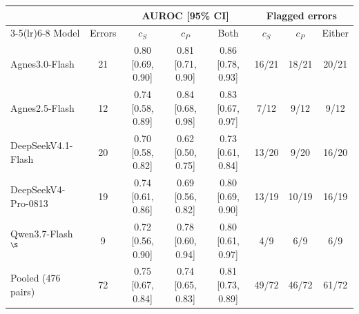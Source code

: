 \footnotesize
\begin{tabular*}{\columnwidth}{@{\extracolsep{\fill}} l c c c c c c c}
\toprule
 & & \multicolumn{3}{c}{AUROC [95\% CI]} & \multicolumn{3}{c}{Flagged errors} \\
\cmidrule(lr){3-5}\cmidrule(lr){6-8}
Model & Errors & $c_S$ & $c_P$ & Both & $c_S$ & $c_P$ & Either \\
\midrule
Agnes3.0-Flash & 21 & 0.80 [0.69, 0.90] & 0.81 [0.71, 0.90] & 0.86 [0.78, 0.93] & 16/21 & 18/21 & 20/21 \\
Agnes2.5-Flash & 12 & 0.74 [0.58, 0.89] & 0.84 [0.68, 0.98] & 0.83 [0.67, 0.97] & 7/12 & 9/12 & 9/12 \\
DeepSeekV4.1-Flash & 20 & 0.70 [0.58, 0.82] & 0.62 [0.50, 0.75] & 0.73 [0.61, 0.84] & 13/20 & 9/20 & 16/20 \\
DeepSeekV4-Pro-0813 & 19 & 0.74 [0.61, 0.86] & 0.69 [0.56, 0.82] & 0.80 [0.69, 0.90] & 13/19 & 10/19 & 16/19 \\
Qwen3.7-Flash$^{\S}$ & 9 & 0.72 [0.56, 0.90] & 0.78 [0.60, 0.94] & 0.80 [0.61, 0.97] & 4/9 & 6/9 & 6/9 \\
\midrule
Pooled (476 pairs) & 72 & 0.75 [0.67, 0.84] & 0.74 [0.65, 0.83] & 0.81 [0.73, 0.89] & 49/72 & 46/72 & 61/72 \\
\bottomrule
\end{tabular*}
